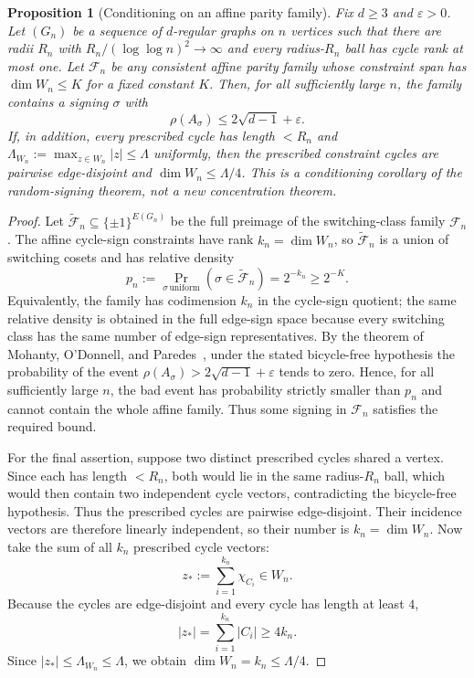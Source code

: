 \documentclass[11pt]{article}
\newtheorem{proposition}[lemma]{Proposition}
\theoremstyle{remark}
\begin{document}
\begin{proposition}[Conditioning on an affine parity family]\label{prop:bf-conditioning}
Fix $d\ge3$ and $\varepsilon>0$. Let $(G_n)$ be a sequence of $d$-regular graphs on
$n$ vertices such that there are radii $R_n$ with
$R_n/(\log\log n)^2\to\infty$ and every radius-$R_n$ ball has cycle rank at most one.
Let $\mathcal F_n$ be any consistent affine parity family whose constraint span has
$\dim W_n\le K$ for a fixed constant $K$. Then, for all sufficiently large $n$, the family
contains a signing $\sigma$ with
\[
\rho(A_\sigma)\le2\sqrt{d-1}+\varepsilon.
\]
If, in addition, every prescribed cycle has length $<R_n$ and
$\Lambda_{W_n}:=\max_{z\in W_n}|z|\le\Lambda$ uniformly, then the prescribed
constraint cycles are pairwise edge-disjoint and
$\dim W_n\le\Lambda/4$.
This is a conditioning corollary of the random-signing theorem, not a new
concentration theorem.
\end{proposition}

\begin{proof}
Let $\widetilde{\mathcal F}_n\subseteq\{\pm1\}^{E(G_n)}$ be the full preimage of the
switching-class family $\mathcal F_n$. The affine cycle-sign constraints have rank
$k_n=\dim W_n$, so $\widetilde{\mathcal F}_n$ is a union of switching cosets and has
relative density
\[
p_n:=\Pr_{\sigma\,\mathrm{uniform}}(\sigma\in\widetilde{\mathcal F}_n)=2^{-k_n}\ge2^{-K}.
\]
Equivalently, the family has codimension $k_n$ in the cycle-sign quotient; the same
relative density is obtained in the full edge-sign space because every switching class has
the same number of edge-sign representatives. By the theorem of Mohanty, O'Donnell, and
Paredes~\cite{mop20}, under the stated bicycle-free hypothesis the probability of the event
$\rho(A_\sigma)>2\sqrt{d-1}+\varepsilon$ tends to zero. Hence, for all sufficiently
large $n$, the bad event has probability strictly smaller than $p_n$ and cannot
contain the whole affine family. Thus some signing in $\mathcal F_n$ satisfies the
required bound.

For the final assertion, suppose two distinct prescribed cycles shared a vertex. Since each
has length $<R_n$, both would lie in the same radius-$R_n$ ball, which would then contain two
independent cycle vectors, contradicting the bicycle-free hypothesis. Thus the prescribed
cycles are pairwise edge-disjoint. Their incidence vectors are therefore linearly independent,
so their number is $k_n=\dim W_n$. Now take the sum of all $k_n$ prescribed cycle vectors:
\[
z_*:=\sum_{i=1}^{k_n}\chi_{C_i}\in W_n.
\]
Because the cycles are edge-disjoint and every cycle has length at least $4$,
\[
|z_*|=\sum_{i=1}^{k_n}|C_i|\ge4k_n.
\]
Since $|z_*|\le\Lambda_{W_n}\le\Lambda$, we obtain
$\dim W_n=k_n\le\Lambda/4$.

\end{proof}
\end{document}
